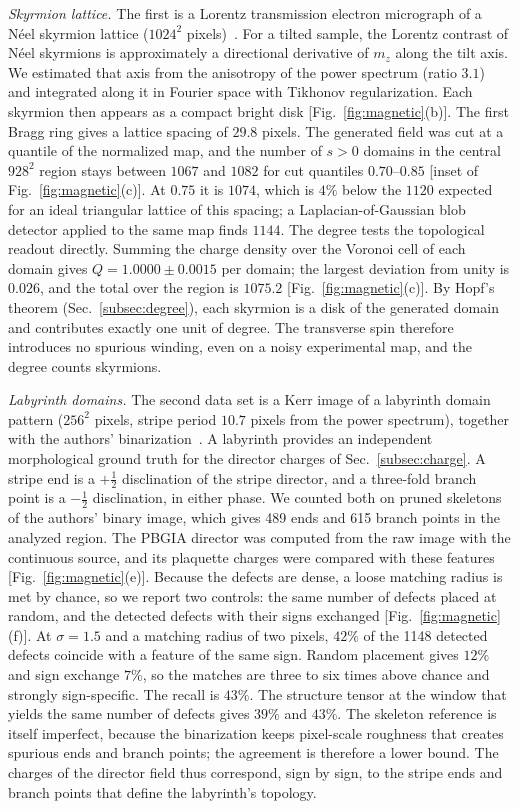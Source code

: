 \documentclass[11pt,a4paper]{article}
\begin{document}
\emph{Skyrmion lattice.} The first is a Lorentz transmission electron micrograph of a N\'eel skyrmion lattice ($1024^2$ pixels)~\cite{McCray2024}. For a tilted sample, the Lorentz contrast of N\'eel skyrmions is approximately a directional derivative of $m_z$ along the tilt axis. We estimated that axis from the anisotropy of the power spectrum (ratio $3.1$) and integrated along it in Fourier space with Tikhonov regularization. Each skyrmion then appears as a compact bright disk [Fig.~\ref{fig:magnetic}(b)]. The first Bragg ring gives a lattice spacing of $29.8$ pixels. The generated field was cut at a quantile of the normalized map, and the number of $s>0$ domains in the central $928^2$ region stays between $1067$ and $1082$ for cut quantiles $0.70$--$0.85$ [inset of Fig.~\ref{fig:magnetic}(c)]. At $0.75$ it is $1074$, which is $4\%$ below the $1120$ expected for an ideal triangular lattice of this spacing; a Laplacian-of-Gaussian blob detector applied to the same map finds $1144$. The degree tests the topological readout directly. Summing the charge density over the Voronoi cell of each domain gives $Q=1.0000\pm0.0015$ per domain; the largest deviation from unity is $0.026$, and the total over the region is $1075.2$ [Fig.~\ref{fig:magnetic}(c)]. By Hopf's theorem (Sec.~\ref{subsec:degree}), each skyrmion is a disk of the generated domain and contributes exactly one unit of degree. The transverse spin therefore introduces no spurious winding, even on a noisy experimental map, and the degree counts skyrmions.

\emph{Labyrinth domains.} The second data set is a Kerr image of a labyrinth domain pattern ($256^2$ pixels, stripe period $10.7$ pixels from the power spectrum), together with the authors' binarization~\cite{Zhao2026}. A labyrinth provides an independent morphological ground truth for the director charges of Sec.~\ref{subsec:charge}. A stripe end is a $+\tfrac12$ disclination of the stripe director, and a three-fold branch point is a $-\tfrac12$ disclination, in either phase. We counted both on pruned skeletons of the authors' binary image, which gives 489 ends and 615 branch points in the analyzed region. The PBGIA director was computed from the raw image with the continuous source, and its plaquette charges were compared with these features [Fig.~\ref{fig:magnetic}(e)]. Because the defects are dense, a loose matching radius is met by chance, so we report two controls: the same number of defects placed at random, and the detected defects with their signs exchanged [Fig.~\ref{fig:magnetic}(f)]. At $\sigma=1.5$ and a matching radius of two pixels, $42\%$ of the 1148 detected defects coincide with a feature of the same sign. Random placement gives $12\%$ and sign exchange $7\%$, so the matches are three to six times above chance and strongly sign-specific. The recall is $43\%$. The structure tensor at the window that yields the same number of defects gives $39\%$ and $43\%$. The skeleton reference is itself imperfect, because the binarization keeps pixel-scale roughness that creates spurious ends and branch points; the agreement is therefore a lower bound. The charges of the director field thus correspond, sign by sign, to the stripe ends and branch points that define the labyrinth's topology.
\end{document}
